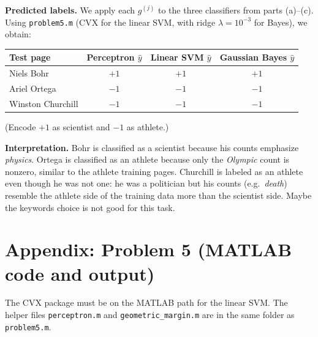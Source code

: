 \documentclass[fleqn]{article}
\begin{document}
    \medskip
    \noindent\textbf{Predicted labels.}
    We apply each $g^{(j)}$ to the three classifiers from parts (a)--(c). Using \texttt{problem5.m} (CVX for the linear SVM, with ridge $\lambda=10^{-3}$ for Bayes), we obtain:
    \begin{center}
    \begin{tabular}{l|ccc}
        \hline
        Test page & Perceptron $\hat y$ & Linear SVM $\hat y$ & Gaussian Bayes $\hat y$ \\
        \hline
        Niels Bohr & $+1$ & $+1$ & $+1$ \\
        Ariel Ortega & $-1$ & $-1$ & $-1$ \\
        Winston Churchill & $-1$ & $-1$ & $-1$ \\
        \hline
    \end{tabular}
    \end{center}
    (Encode $+1$ as scientist and $-1$ as athlete.)

    \medskip
    \noindent\textbf{Interpretation.}
    Bohr is classified as a scientist because his counts emphasize \emph{physics}.
    Ortega is classified as an athlete because only the \emph{Olympic} count is nonzero, similar to the athlete training pages.
    Churchill is labeled as an athlete even though he was not one: he was a politician but his counts (e.g.\ \emph{death}) resemble the athlete side of the training data more than the scientist side.
    Maybe the keywords choice is not good for this task.

    \newpage
    \section{Appendix: Problem 5 (MATLAB code and output)}
    The CVX package must be on the MATLAB path for the linear SVM. The helper files \texttt{perceptron.m} and \texttt{geometric\_margin.m} are in the same folder as \texttt{problem5.m}.
\end{document}

